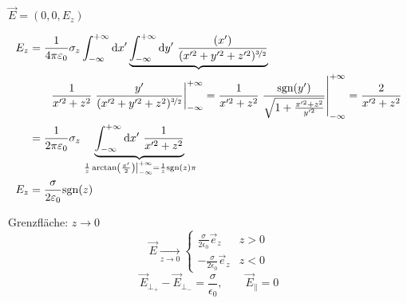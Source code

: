 $\vec{E} = (0,0,E_z)$

\begin{align*}
 	E_z &= \frac{1}{4\pi\varepsilon_0} \sigma_z \int_{-\infty}^{+\infty}\textrm{d} x'\underbrace{\int_{-\infty}^{+\infty}\textrm{d} y'\ \frac{(x')}{(x'^2 + y'^2 + z'^2)^{\nicefrac{3}{2}}}}\\
 	& \qquad \frac{1}{x'^2 +z^2}\left.\frac{y'}{(x'^2 + y'^2 + z^2)^{\nicefrac{3}{2}}} \right\rvert_{-\infty}^{+\infty} = \frac{1}{x'^2 +z^2}\left.\frac{\textrm{sgn}(y')}{\sqrt{1 + \frac{x'^2 + z^2}{y'^2}}} \right\rvert_{-\infty}^{+\infty} = \frac{2}{x'^2 +z^2}\\
 	&= \frac{1}{2 \pi \varepsilon_0} \sigma_z \underbrace{\int_{-\infty}^{+\infty} \textrm{d} x'\ \frac{1}{x'^2 + z^2}}_{\left. \frac{1}{z} \arctan \left(\frac{x'}{2}\right)\right\rvert_{-\infty}^{+\infty} = \frac{1}{z} \textrm{sgn}(z)\pi}\\
 	E_z &= \frac{\sigma}{2 \varepsilon_0} \textrm{sgn}(z)
\end{align*}
\begin{minipage}{.6\linewidth}
	Grenzfläche: $z \rightarrow 0$
	$$\vec{E} \underset{z \to 0} \longrightarrow \left\{ \begin{array}{cc}
	\frac{\sigma}{2 \epsilon_0} \vec{e}_z & z > 0\\
	-\frac{\sigma}{2 \epsilon_0} \vec{e}_z & z < 0
	\end{array}\right.$$
	$$\vec{E}_{\perp_+} - \vec{E}_{\perp_-} = \frac{\sigma}{\epsilon_0}, \qquad \vec{E}_\parallel = 0$$
\end{minipage}%
\begin{minipage}{.4\linewidth}
	\centering
\end{minipage}%
